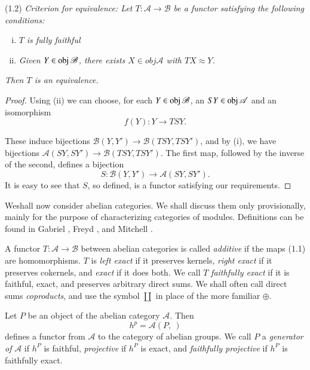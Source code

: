 (1.2) \textit{Criterion for equivalence: Let $T : \mathscr{A} \to
     \mathscr{B}$ be a functor satisfying the following conditions:}  
   \begin{enumerate} [(i)]
\item $T$ \textit{is fully faithful}

\item \textit{Given $Y \in  \operatorname{obj} \mathscr{B}$, there exists
  $X \in obj \mathscr{A}$ with $TX \approx Y$.}
   \end{enumerate}   
   \textit{Then $T$ is an equivalence.}

   \begin{proof}
Using (ii) we can choose, for each $Y \in \operatorname{obj} \mathscr{B}$, an $SY
\in \operatorname{obj} \mathscr{A}$ and an isomorphism 
$$
f(Y) :Y  \to TS Y.
$$

These induce bijections $\mathscr{B} (Y,Y') \to  \mathscr{B} (TSY,
TSY')$, and by (i), we have bijections $\mathscr{A}(SY, SY') \to
\mathscr{B} (TSY, TSY')$. The first map, followed by the inverse of
the second, defines a bijection  
$$
S: \mathscr{B}(Y,Y') \to \mathscr{A} (SY, SY').
$$
It is easy to see that $S$, so defined, is a functor satisfying our
requirements. 
   \end{proof}

We\pageoriginale shall now consider abelian categories. We shall
discuss them only 
provisionally, mainly for the purpose of characterizing categories of
modules. Definitions can be found in Gabriel \cite{key1}, Freyd
\cite{key1}, and Mitchell \cite{key1}. 

A functor $T: \mathscr{A} \to \mathscr{B}$ between abelian categories
is called \textit{additive} if the maps (1.1) are homomorphisms. $T$
is \textit{left exact} if it preserves kernels, \textit{right exact}
if it preserves cokernels, and \textit{exact} if it does both. We call
$T$ \textit{faithfully exact} if it is faithful, exact, and
preserves arbitrary direct sums. We shall often call direct sums
\textit{coproducts}, and use the symbol $\coprod$ in place of the
more familiar $\oplus$.  


Let $P$ be an object of the abelian category $\mathscr{A}$. Then 
$$
h^p = \mathscr{A}(P, ~)
$$
defines a functor from $\mathscr{A}$ to the category of abelian
groups. We call $P$ a \textit{generator of} $\mathscr{A}$ if $h^P$ is
faithful, \textit{projective} if $h^P$  is exact, and
\textit{faithfully projective} if $h^P$ is faithfully exact. 

